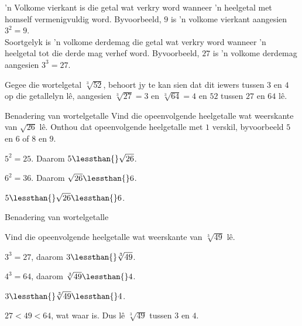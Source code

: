       
’n Volkome vierkant is die getal wat verkry word wanneer ’n heelgetal met homself vermenigvuldig word. Byvoorbeeld, $9$  is ’n volkome vierkant aangesien ${3}^{2}=9$. \\
Soortgelyk is ’n volkome derdemag die getal wat verkry word wanneer ’n heelgetal
tot die derde mag verhef word. Byvoorbeeld, $27$ is ’n volkome derdemag aangesien ${3}^{3}=27$.
\par 
Gegee die wortelgetal $\sqrt[3]{52}$, behoort jy te kan sien dat dit iewers tussen $3$ en $4$ op die getallelyn lê, aangesien $\sqrt[3]{27}=3$ en $\sqrt[3]{64}=4$ en $52$ tussen $27$ en $64$ lê.

\begin{wex}{Benadering van wortelgetalle}
{
Vind die opeenvolgende heelgetalle wat weerskante van $\sqrt{26}$ lê.
Onthou dat opeenvolgende heelgetalle met $1$ verskil, byvoorbeeld $5$ en $6$ of $8$ en $9$.
}
{
           
${5}^{2}=25$. Daarom $5\lessthan{}\sqrt{26}$.

${6}^{2}=36$. 
Daarom $\sqrt{26}\lessthan{}6$.

$5\lessthan{}\sqrt{26}\lessthan{}6$. 
}
\end{wex}


\begin{wex}{Benadering van wortelgetalle }{

Vind die opeenvolgende heelgetalle wat weerskante van $\sqrt[3]{49}$ lê.
}
{
   ${3}^{3}=27$, daarom $3\lessthan{}\sqrt[3]{49}$.

 ${4}^{3}=64$, daarom $\sqrt[3]{49}\lessthan{}4$. 

$3\lessthan{}\sqrt[3]{49}\lessthan{}4$.

$27<49<64$, wat waar is. Dus lê $\sqrt[3]{49}$ tussen $3$ en $4$.
}
\end{wex}

